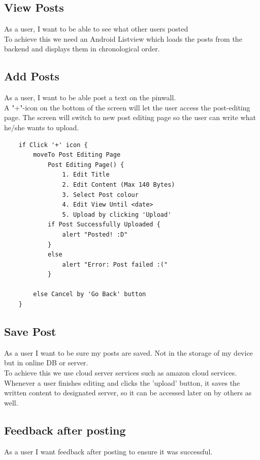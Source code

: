 \documentclass[conference]{IEEEtran}
\numberwithin{figure}{subsection}
\begin{document}
\subsection{View Posts}
As a user, I want to be able to see what other users posted\\

To achieve this we need an Android Listview which loads the posts from the backend and displays them in chronological order.
	
\subsection{Add Posts}
As a user, I want to be able post a text on the pinwall.\\

A "+"-icon on the bottom of the screen will let the user access the post-editing page. The screen will switch to new post editing page so the user can write what he/she wants to upload.
\begin{lstlisting}
    if Click '+' icon {
        moveTo Post Editing Page
            Post Editing Page() {
                1. Edit Title
                2. Edit Content (Max 140 Bytes)
                3. Select Post colour
                4. Edit View Until <date>
                5. Upload by clicking 'Upload'
            if Post Successfully Uploaded {
                alert "Posted! :D"
            }
            else
                alert "Error: Post failed :("
            }
        
        else Cancel by 'Go Back' button
    }
\end{lstlisting}

\subsection{Save Post}
As a user I want to be sure my posts are saved. Not in the storage of my device but in online DB or server.\\

To achieve this we use cloud server services such as amazon cloud services. Whenever a user finishes editing and clicks the 'upload' button, it saves the written content to designated server, so it can be accessed later on by others as well. 

\subsection{Feedback after posting}
As a user I want feedback after posting to ensure it was successful.\\
\end{document}
